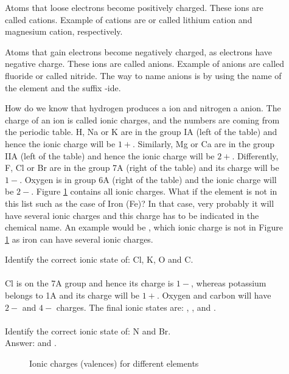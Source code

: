 \documentclass[main.tex]{subfiles}
\begin{document}
   
\begin{description}
\item[] Atoms that loose electrons become positively charged. These ions are called cations. Example of cations are  or  called lithium cation and magnesium cation, respectively.
\item[] Atoms that gain electrons become negatively charged, as electrons have negative charge. These ions are called anions. Example of anions are   called fluoride or  called nitride. The way to name anions is by using the name of the element and the suffix -ide.
\item[] How do we know that hydrogen produces a  ion and nitrogen a  anion. The charge of an ion is called ionic charges, and the numbers are coming from the periodic table. H, Na or K are in the group IA (left of the table) and hence the ionic charge will be $1+$.  Similarly, Mg or Ca are in the group IIA (left of the table) and hence the ionic charge will be $2+$. Differently, F, Cl or Br are in the group 7A (right of the table) and its charge will be $1-$. Oxygen is in group 6A (right of the table) and the ionic charge will be $2-$. Figure \ref{fig:naming2} contains all ionic charges. What if the element is not in this list such as the case of Iron (Fe)? In that case, very probably it will have several ionic charges and this charge has to be indicated in the chemical name. An example would be , which ionic charge is not in Figure \ref{fig:naming2}  as iron can have several ionic charges.






\begin{example} %
Identify the correct ionic state of: Cl, K, O and C. \\
\\
Cl is on the 7A group and hence its charge is $1-$, whereas potassium belongs to 1A and its charge will be $1+$. Oxygen and carbon will have $2-$ and $4-$ charges. The final ionic states are: , ,  and .
\\
\faDiamond\ \\
Identify the correct ionic state of: N and Br.\\
\flushright Answer:  and .
\end{example}%


\begin{figure}[h] %
\begin{center}\EmptyTable\end{center}
\caption{Ionic charges (valences) for different elements}
\label{fig:naming2}
\end{figure}%

\end{description}
\end{document}
